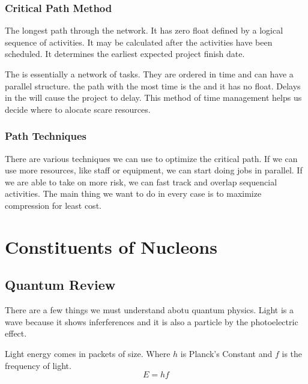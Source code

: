 \documentclass[english, 11pt]{article}
\begin{document}
      \subsubsection{Critical Path Method} \label{cpm}
        \begin{defn} \label{cp}
          The longest path through the network. It has zero float defined by a logical sequence of activities. It may be calculated after the activities have been scheduled. It determines the earliest expected project finish date. 
        \end{defn}

        The  is essentially a network of tasks. They are ordered in time and can have a parallel structure. the path with the most time is the  and it has no float. Delays in the  will cause the project to delay. This method of time management helps us decide where to alocate scare resources.\\

      \subsubsection{Path Techniques}
        There are various techniques we can use to optimize the critical path. If we can use more resources, like staff or equipment, we can start doing jobs in parallel. If we are able to take on more risk, we can fast track and overlap sequencial activities. The main thing we want to do in every case is to maximize compression for least cost.


  \section{Constituents of Nucleons}

  \subsection{Quantum Review}
    There are a few things we must understand abotu quantum physics. Light is a wave because it shows inferferences and it is also a particle by the photoelectric effect.

    \begin{defn}\label{pe}
    Light energy comes in packets of size. Where $h$ is Planck's Constant and $f$ is the frequency of light.
      \[ E =hf \]
    \end{defn}
\end{document}
